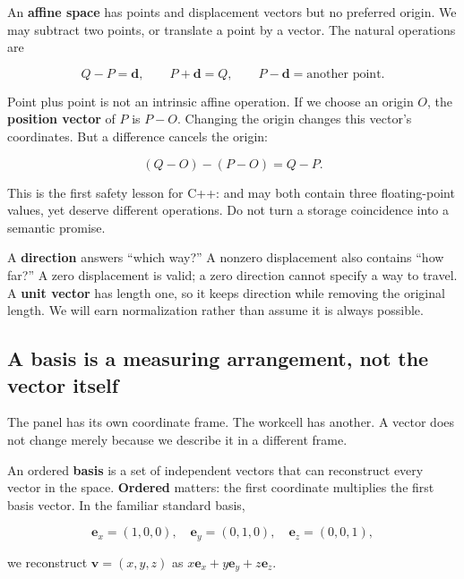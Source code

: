 \hypertarget{01-foundations-i-ch017-affine-points-do-not-have-an-intrinsic-zero}{}

An \textbf{affine space} has points and displacement vectors but no preferred origin. We may subtract two points, or translate a point by a vector. The natural operations are

\[
Q-P=\mathbf d,\qquad P+\mathbf d=Q,\qquad P-\mathbf d=\text{another point}.
\]

Point plus point is not an intrinsic affine operation. If we choose an origin \(O\), the \textbf{position vector} of \(P\) is \(P-O\). Changing the origin changes this vector's coordinates. But a difference cancels the origin:

\[
(Q-O)-(P-O)=Q-P.
\]

This is the first safety lesson for C++:  and  may both contain three floating-point values, yet deserve different operations. Do not turn a storage coincidence into a semantic promise.

A \textbf{direction} answers ``which way?'' A nonzero displacement also contains ``how far?'' A zero displacement is valid; a zero direction cannot specify a way to travel. A \textbf{unit vector} has length one, so it keeps direction while removing the original length. We will earn normalization rather than assume it is always possible.

\subsection{A basis is a measuring arrangement, not the vector itself}\label{01-foundations-i-ch017-a-basis-is-a-measuring-arrangement-not-the-vector-itself}

\hypertarget{01-foundations-i-ch017-a-basis-is-a-measuring-arrangement-not-the-vector-itself}{}

The panel has its own coordinate frame. The workcell has another. A vector does not change merely because we describe it in a different frame.

An ordered \textbf{basis} is a set of independent vectors that can reconstruct every vector in the space. \textbf{Ordered} matters: the first coordinate multiplies the first basis vector. In the familiar standard basis,

\[
\mathbf e_x=(1,0,0),\quad
\mathbf e_y=(0,1,0),\quad
\mathbf e_z=(0,0,1),
\]

we reconstruct \(\mathbf v=(x,y,z)\) as \(x\mathbf e_x+y\mathbf e_y+z\mathbf e_z\).

